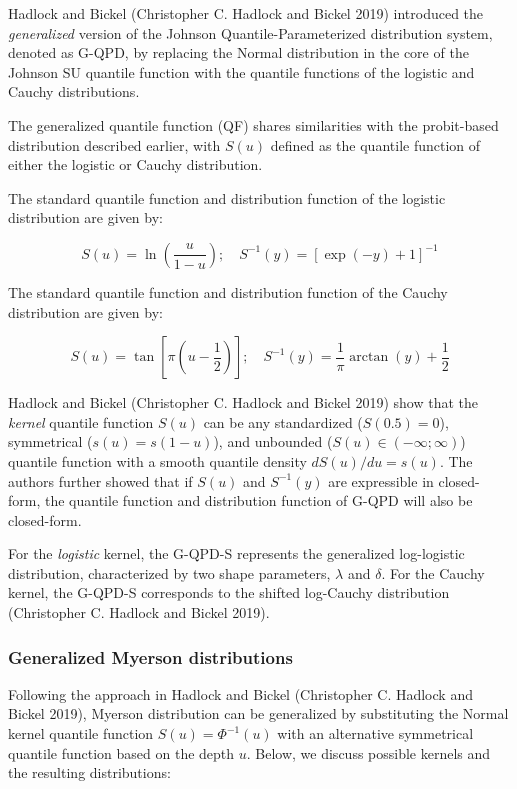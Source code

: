 \documentclass[
]{interact}
\begin{document}
Hadlock and Bickel (Christopher C. Hadlock and Bickel 2019) introduced
the \emph{generalized} version of the Johnson Quantile-Parameterized
distribution system, denoted as G-QPD, by replacing the Normal
distribution in the core of the Johnson SU quantile function with the
quantile functions of the logistic and Cauchy distributions.

The generalized quantile function (QF) shares similarities with the
probit-based distribution described earlier, with \(S(u)\) defined as
the quantile function of either the logistic or Cauchy distribution.

The standard quantile function and distribution function of the logistic
distribution are given by:

\[
S(u)= \ln\left(\frac{u}{1-u}\right);\quad S^{-1}(y)=[\exp(-y)+1]^{-1}
\]

The standard quantile function and distribution function of the Cauchy
distribution are given by:

\[
S(u)= \tan\left[\pi\left(u-\frac{1}{2}\right)\right];\quad S^{-1}(y)=\frac{1}{ \pi}\arctan(y)+\frac{1}{2}
\]

Hadlock and Bickel (Christopher C. Hadlock and Bickel 2019) show that
the \emph{kernel} quantile function \(S(u)\) can be any standardized
(\(S(0.5)=0\)), symmetrical (\(s(u)=s(1-u)\)), and unbounded
(\(S(u)\in(-\infty;\infty)\)) quantile function with a smooth quantile
density \(dS(u)/du=s(u)\). The authors further showed that if \(S(u)\)
and \(S^{-1}(y)\) are expressible in closed-form, the quantile function
and distribution function of G-QPD will also be closed-form.

For the \emph{logistic} kernel, the G-QPD-S represents the generalized
log-logistic distribution, characterized by two shape parameters,
\(\lambda\) and \(\delta\). For the Cauchy kernel, the G-QPD-S
corresponds to the shifted log-Cauchy distribution (Christopher C.
Hadlock and Bickel 2019).

\subsubsection{Generalized Myerson
distributions}\label{generalized-myerson-distributions}

Following the approach in Hadlock and Bickel (Christopher C. Hadlock and
Bickel 2019), Myerson distribution can be generalized by substituting
the Normal kernel quantile function \(S(u)=\Phi^{-1}(u)\) with an
alternative symmetrical quantile function based on the depth \(u\).
Below, we discuss possible kernels and the resulting distributions:
\end{document}
